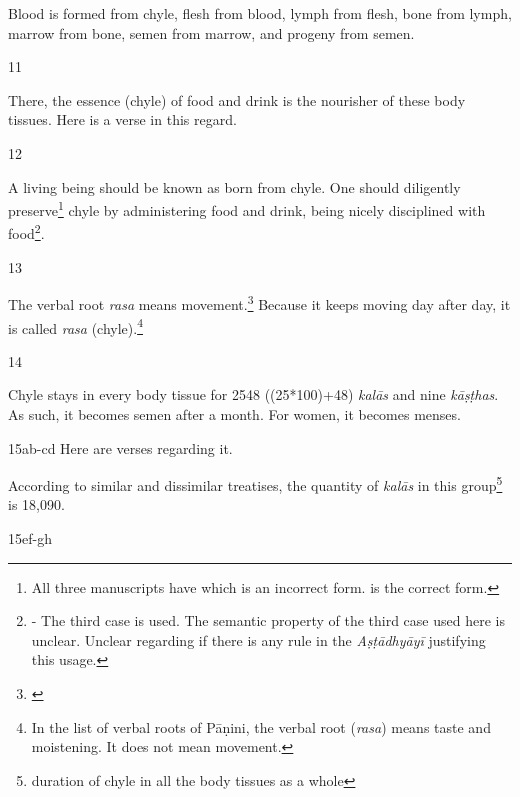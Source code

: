 \begin{translation}
\begin{sloka}
Blood is formed from chyle, flesh from blood, lymph from flesh, bone from lymph, marrow from bone, semen from marrow, and progeny from semen. 
\end{sloka}

\item [11]

There, the essence (chyle) of food and drink is the nourisher of these body tissues.
Here is a verse in this regard.

\item[12]

\begin{sloka}
A living being should be known as born from chyle. One should diligently preserve\footnote{All three manuscripts have  which is an incorrect form.  is the correct form.} chyle by administering food and drink, being nicely disciplined with food\footnote{ - The third case is used. The semantic property of the third case used here is unclear. Unclear regarding if there is any rule in the \emph{Aṣṭādhyāyī} justifying this usage.}.
\end{sloka}

\item[13]

The verbal root \emph{rasa} means movement.\footnote{\cite[109]{kunj-1907}} Because it keeps moving day after day, it is called \emph{rasa} (chyle).\footnote{In the list of verbal roots of Pāṇini, the verbal root (\emph{rasa}) means taste and moistening. It does not mean movement.}    

\item[14]

Chyle stays in every body tissue for 2548 ((25*100)+48) \emph{kalās} and nine \emph{kāṣṭhas}. As such, it becomes semen after a month. For women, it becomes menses.  

\item[15ab-cd] Here are verses regarding it.

\begin{sloka}
According to similar and dissimilar treatises, the quantity of \emph{kalās} in this group\footnote{duration of chyle in all the body tissues as a whole} is 18,090.
\end{sloka}

\item[15ef-gh]


\end{translation}
